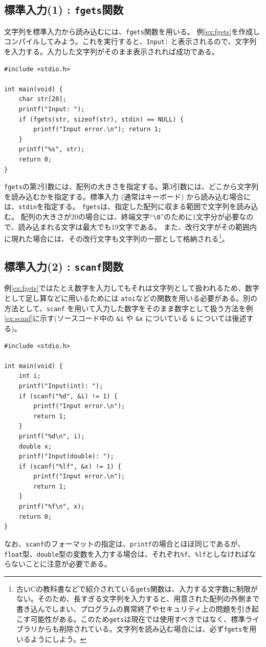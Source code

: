 \subsection{標準入力(1) : \texttt{fgets}関数}
文字列を標準入力から読み込むには、\texttt{fgets}関数を用いる。
例\ref{ex:fgets}を作成しコンパイルしてみよう。これを実行すると、\texttt{Input:} と表示されるので、文字列を入力する。入力した文字列がそのまま表示されれば成功である。
\begin{reidai}\label{ex:fgets}
\begin{verbatim}
#include <stdio.h>

int main(void) {
    char str[20];
    printf("Input: ");
    if (fgets(str, sizeof(str), stdin) == NULL) {
        printf("Input error.\n"); return 1;
    }
    printf("%s", str);
    return 0;
}
\end{verbatim}
\end{reidai}

\texttt{fgets}の第2引数には、配列の大きさを指定する。第3引数には、どこから文字列を読み込むかを指定する。標準入力 (通常はキーボード) から読み込む場合には、\texttt{stdin}を指定する。
\texttt{fgets}は、指定した配列に収まる範囲で文字列を読み込む。
配列の大きさが20の場合には、終端文字``\texttt{\textbackslash 0}''のために1文字分が必要なので、読み込まれる文字は最大でも19文字である。
また、改行文字がその範囲内に現れた場合には、その改行文字も文字列の一部として格納される\footnote{古いCの教科書などで紹介されている\texttt{gets}関数は、入力する文字数に制限がない。そのため、長すぎる文字列を入力すると、用意された配列の外側まで書き込んでしまい、プログラムの異常終了やセキュリティ上の問題を引き起こす可能性がある。このため\texttt{gets}は現在では使用すべきではなく、標準ライブラリからも削除されている。文字列を読み込む場合には、必ず\texttt{fgets}を用いるようにしよう。}。

\subsection{標準入力(2) : \texttt{scanf}関数}
例\ref{ex:fgets}ではたとえ数字を入力してもそれは文字列として扱われるため、数字として足し算などに用いるためには \texttt{atoi}などの関数を用いる必要がある。別の方法として、\texttt{scanf} を用いて入力した数字をそのまま数字として扱う方法を例\ref{ex:scanf}に示す(ソースコード中の \texttt{\&i} や \texttt{\&x} についている \texttt{\&} については後述する)。
\begin{reidai}\label{ex:scanf}
    \begin{verbatim}
#include <stdio.h>

int main(void) {
    int i;
    printf("Input(int): ");
    if (scanf("%d", &i) != 1) {
        printf("Input error.\n");
        return 1;
    }
    printf("%d\n", i);
    double x;
    printf("Input(double): ");
    if (scanf("%lf", &x) != 1) {
        printf("Input error.\n");
        return 1;
    }
    printf("%f\n", x);
    return 0;
}
\end{verbatim}
\end{reidai}
なお、\texttt{scanf}のフォーマットの指定は、\texttt{printf}の場合とほぼ同じであるが、\texttt{float}型、\texttt{double}型の変数を入力する場合は、それぞれ\texttt{\%f}、\texttt{\%lf}としなければならないことに注意が必要である。


